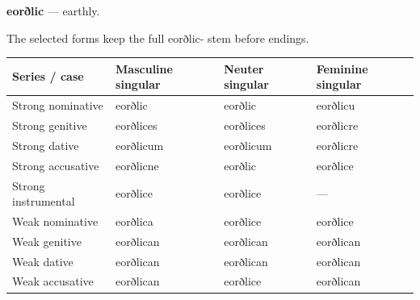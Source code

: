 \par\begin{minipage}{\linewidth}\raggedright
\textbf{eorðlic} — earthly.

The selected forms keep the full eorðlic- stem before endings.

\par\begingroup
\fontsize{10.5}{13.2}\selectfont
\setlength{\LTleft}{0pt}\setlength{\LTright}{\fill}
\noindent
\begin{tabular}{@{}>{\raggedright\arraybackslash}p{33.348mm}>{\raggedright\arraybackslash}p{28.726mm}>{\raggedright\arraybackslash}p{25.754mm}>{\raggedright\arraybackslash}p{27.735mm}@{}}
\toprule
\textbf{Series /\allowbreak{} case} & \textbf{Masculine singular} & \textbf{Neuter singular} & \textbf{Feminine singular} \\
\midrule
Strong nominative & eorðlic & eorðlic & eorðlicu \\
Strong genitive & eorðlices & eorðlices & eorðlicre \\
Strong dative & eorðlicum & eorðlicum & eorðlicre \\
Strong accusative & eorðlicne & eorðlic & eorðlice \\
Strong instrumental & eorðlice & eorðlice & — \\
Weak nominative & eorðlica & eorðlice & eorðlice \\
Weak genitive & eorðlican & eorðlican & eorðlican \\
Weak dative & eorðlican & eorðlican & eorðlican \\
Weak accusative & eorðlican & eorðlice & eorðlican \\
\bottomrule
\end{tabular}
\par\endgroup
\end{minipage}\par
\par\addvspace{5pt}
\par\begingroup
\fontsize{10.5}{13.2}\selectfont
\setlength{\LTleft}{0pt}\setlength{\LTright}{\fill}
\noindent
